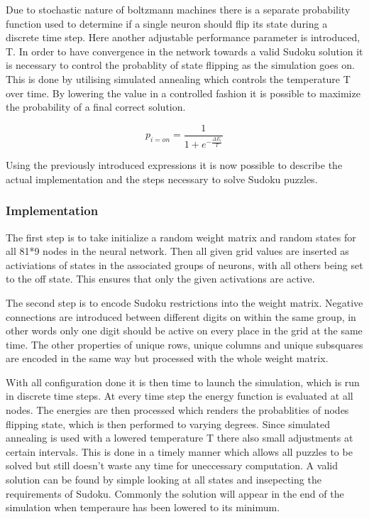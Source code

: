\documentclass[a4paper,11pt]{kth-mag}
\begin{document}
Due to stochastic nature of boltzmann machines there is a separate probability function used to determine if a single neuron should flip its state during a discrete time step. \cite{boltzmann2}
Here another adjustable performance parameter is introduced, T.
In order to have convergence in the network towards a valid Sudoku solution it is necessary to control the probablity of state flipping as the simulation goes on.
This is done by utilising simulated annealing which controls the temperature T over time.
By lowering the value in a controlled fashion it is possible to maximize the probability of a final correct solution.

\[
p_{i=on} = \frac{1}{1+e^{-\frac{\Delta E_{i}}{T}}}
\]

Using the previously introduced expressions it is now possible to describe the actual implementation and the steps necessary to solve Sudoku puzzles.
\newline

\subsubsection{Implementation}

The first step is to take initialize a random weight matrix and random states for all 81*9 nodes in the neural network.
Then all given grid values are inserted as activiations of states in the associated groups of neurons, with all others being set to the off state.
This ensures that only the given activations are active.
\newline

The second step is to encode Sudoku restrictions into the weight matrix.
Negative connections are introduced between different digits on within the same group, in other words only one digit should be active on every place in the grid at the same time.
The other properties of unique rows, unique columns and unique subsquares are encoded in the same way but processed with the whole weight matrix.
\newline

With all configuration done it is then time to launch the simulation, which is run in discrete time steps.
At every time step the energy function is evaluated at all nodes.
The energies are then processed which renders the probablities of nodes flipping state, which is then performed to varying degrees.
Since simulated annealing is used with a lowered temperature T there also small adjustments at certain intervals.
This is done in a timely manner which allows all puzzles to be solved but still doesn't waste any time for uneccessary computation.
\newline
A valid solution can be found by simple looking at all states and insepecting the requirements of Sudoku.
Commonly the solution will appear in the end of the simulation when temperaure has been lowered to its minimum.
\end{document}
